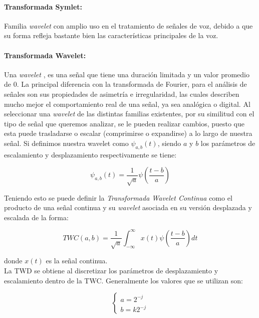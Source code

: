 \documentclass[11pt]{article}
\begin{document}
\paragraph*{Transformada Symlet:}
Familia {\it wavelet} con amplio uso en el tratamiento de señales de voz, debido a que su forma refleja bastante bien las características principales de la voz.

\paragraph*{Transformada Wavelet:}
Una {\it wavelet} \cite{wavelet}, es una señal que tiene una duración limitada y un valor promedio de 0. La principal diferencia con la transformada de Fourier, para el análisis de señales son sus propiedades de asimetría e irregularidad, las cuales describen 
mucho mejor el comportamiento real de una señal, ya sea analógica o digital. Al seleccionar una {\it wavelet} de las distintas familias existentes, por su similitud con el tipo de señal que queremos analizar, se le pueden realizar cambios, puesto que esta puede trasladarse 
o escalar (comprimirse o expandirse) a lo largo de nuestra señal. Si definimos nuestra wavelet como \(\psi_{a, b}(t)\), siendo \(a\) y \(b\) los parámetros de escalamiento y desplazamiento respectivamente se tiene:

\begin{equation*}
    \psi_{a,b}(t) = \frac{1}{\sqrt{a}}\psi(\frac{t - b}{a})
\end{equation*}

Teniendo esto se puede definir la {\it Transformada Wavelet Continua} como el producto de una señal continua y su {\it wavelet} asociada en su versión desplazada y escalada de la forma:

\begin{equation*}
    TWC(a, b) = \frac{1}{\sqrt{a}}\int_{-\infty}^{\infty}x(t)\psi(\frac{t - b}{a})dt
\end{equation*}

donde \(x(t)\) es la señal continua.\\
La TWD se obtiene al discretizar los parámetros de desplazamiento y escalamiento dentro de la TWC. Generalmente los valores que se utilizan son:

\begin{equation*}
    \begin{cases}
        a=2^{-j}\\
        b=k2^{-j}
    \end{cases}
\end{equation*}
\end{document}
